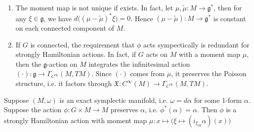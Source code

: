 \documentclass[
11pt, %
letterpaper， %
oneside, %
headinclude,footinclude, %
BCOR5mm, %
]{scrartcl}
\begin{document}
\begin{rem}
	\begin{enumerate}
		\item The moment map is not unique if exists. In fact, let $\mu, \tilde{\mu}: M\to \mathfrak{g}^*$, then for any $\xi \in \mathfrak{g}$, we have $d\big((\mu-\tilde{\mu})^*\xi \big)=0$. Hence $(\mu-\tilde{\mu}): M\to \mathfrak{g}^*$  is constant on each connected component of $M$.
		\item If $G$ is connected, the requirement that $\phi$ acts sympectically is redundant for strongly Hamiltonian actions. In fact, if  $G$ acts on $M$ with a moment map $\mu$, then the $\mathfrak{g}$-action on $M$ integrates the infinitesimal action $(\cdot): \mathfrak{g} \to \Gamma_{C^{\infty}}(M,TM)$. Since $(\cdot)$ comes from $\mu$, it preserves the Poisson structure, i.e. it factors through $\mathfrak{X}: C^{\infty}(M)\to \Gamma_{C^{\infty}}(M,TM)$.
	\end{enumerate}
\end{rem}

\begin{ex}
	Suppose $(M,\omega)$ is an exact symplectic manifold, i.e. $\omega=d\alpha$ for some 1-form $\alpha$. Suppose the action $\phi: G\times M \to M$ preserves $\alpha$, i.e. $\phi^*(\alpha)=\alpha$. Then $\phi$ is a strongly Hamiltonian action with moment map $\mu: x\mapsto \big(\xi \mapsto (i_{\xi_M}\alpha)(x ) \big)$
\end{ex}
\end{document}
